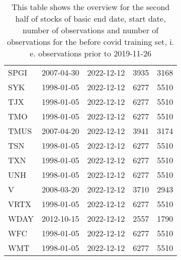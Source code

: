 \begin{table}[ht]
\begin{tabular}{lllrr}
  SPGI & 2007-04-30 & 2022-12-12 & 3935 & 3168 \\ 
  SYK & 1998-01-05 & 2022-12-12 & 6277 & 5510 \\ 
  TJX & 1998-01-05 & 2022-12-12 & 6277 & 5510 \\ 
  TMO & 1998-01-05 & 2022-12-12 & 6277 & 5510 \\ 
  TMUS & 2007-04-20 & 2022-12-12 & 3941 & 3174 \\ 
  TSN & 1998-01-05 & 2022-12-12 & 6277 & 5510 \\ 
  TXN & 1998-01-05 & 2022-12-12 & 6277 & 5510 \\ 
  UNH & 1998-01-05 & 2022-12-12 & 6277 & 5510 \\ 
  V & 2008-03-20 & 2022-12-12 & 3710 & 2943 \\ 
  VRTX & 1998-01-05 & 2022-12-12 & 6277 & 5510 \\ 
  WDAY & 2012-10-15 & 2022-12-12 & 2557 & 1790 \\ 
  WFC & 1998-01-05 & 2022-12-12 & 6277 & 5510 \\ 
  WMT & 1998-01-05 & 2022-12-12 & 6277 & 5510 \\ 
   \hline
\end{tabular}
\caption[Overview_2]{This table shows the overview for the second half of stocks of basic end date, start date, number of observations and number of observations 
                     for the before covid training set, i. e. observations prior to 2019-11-26} 
\label{Table:Overview_2}
\end{table}
